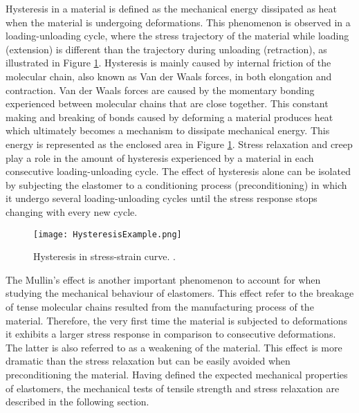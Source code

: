 Hysteresis in a material is defined as the mechanical energy dissipated as heat when the material is undergoing deformations. This phenomenon is observed in a loading-unloading cycle, where the stress trajectory of the material while loading (extension) is different than the trajectory during unloading (retraction), as illustrated in Figure \ref{fig:hysteresis}. Hysteresis is mainly caused by internal friction of the molecular chain, also known as Van der Waals forces, in both elongation and contraction. Van der Waals forces are caused by the momentary bonding experienced between molecular chains that are close together. This constant making and breaking of bonds caused by deforming a material produces heat which ultimately becomes a mechanism to dissipate mechanical energy. This energy is represented as the enclosed area in Figure \ref{fig:hysteresis}. Stress relaxation and creep play a role in the amount of hysteresis experienced by a material in each consecutive loading-unloading cycle. The effect of hysteresis alone can be isolated by subjecting the elastomer to a conditioning process (preconditioning) in which it undergo several loading-unloading cycles until the stress response stops changing with every new cycle.

\begin{figure}[hb!]
    \centering
    \texttt{[image: HysteresisExample.png]}
    \caption{Hysteresis in stress-strain curve. \cite{Bauman2008}.}
    \label{fig:hysteresis}
\end{figure}

The Mullin's effect is another important phenomenon to account for when studying the mechanical behaviour of elastomers. This effect refer to the breakage of tense molecular chains resulted from the manufacturing process of the material. Therefore, the very first time the material is subjected to deformations it exhibits a larger stress response in comparison to consecutive deformations. The latter is also referred to as a weakening of the material. This effect is more dramatic than the stress relaxation but can be easily avoided when preconditioning the material. Having defined the expected mechanical properties of elastomers, the mechanical tests of tensile strength and stress relaxation are described in the following section.


